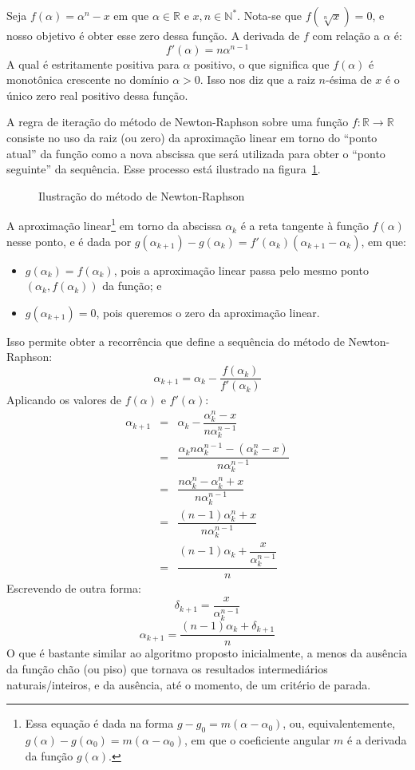 \documentclass{article}
\begin{document}
Seja $f(\alpha) = \alpha^n - x$
em que $\alpha \in \mathds{R}$ e $x, n \in \mathds{N}^*$.
Nota-se que $f(\sqrt[n]{x}) = 0$,
e nosso objetivo é obter esse zero dessa função.
A derivada de $f$ com relação a $\alpha$ é:
\[f'(\alpha) = n \alpha^{n-1}\]
A qual é estritamente positiva para $\alpha$ positivo,
o que significa que $f(\alpha)$ é monotônica crescente
no domínio $\alpha > 0$.
Isso nos diz que a raiz $n$-ésima de $x$
é o único zero real positivo dessa função.

A regra de iteração do método de Newton-Raphson
sobre uma função $f:\mathds{R}\to\mathds{R}$
consiste no uso da raiz (ou zero)
da aproximação linear em torno do ``ponto atual'' da função
como a nova abscissa que será utilizada
para obter o ``ponto seguinte'' da sequência.
Esse processo está ilustrado na figura~\ref{fig:newton-raphson}.

\begin{figure}[H]
  \centering
  
  \caption{Ilustração do método de Newton-Raphson}
  \label{fig:newton-raphson}
\end{figure}

A aproximação linear\footnote{
  Essa equação é dada na forma $g - g_0 = m (\alpha - \alpha_0)$,
  ou, equivalentemente,
  $g(\alpha) - g(\alpha_0) = m (\alpha - \alpha_0)$,
  em que o coeficiente angular $m$ é a derivada da função $g(\alpha)$.
} em torno da abscissa $\alpha_k$
é a reta tangente à função $f(\alpha)$ nesse ponto,
e é dada por
$g(\alpha_{k+1}) - g(\alpha_k) =
 f'(\alpha_k) \left( \alpha_{k+1} - \alpha_k \right)$,
em que:
\begin{itemize}
  \item
  $g(\alpha_k) = f(\alpha_k)$, pois a aproximação linear
  passa pelo mesmo ponto $(\alpha_k, f(\alpha_k))$ da função; e
  \item
  $g(\alpha_{k+1}) = 0$,
  pois queremos o zero da aproximação linear.
\end{itemize}

Isso permite obter a recorrência
que define a sequência do método de Newton-Raphson:
\[\alpha_{k+1} = \alpha_k - \dfrac{f(\alpha_k)}{f'(\alpha_k)}\]
Aplicando os valores de $f(\alpha)$ e $f'(\alpha)$:
\[
  \begin{array}{rcl}
  \alpha_{k+1}
  &=& \alpha_k - \dfrac{\alpha_k^n - x}{n \alpha_k^{n-1}} \\[5mm]
  &=& \dfrac{\alpha_k n \alpha_k^{n-1}
    - (\alpha_k^n - x)}{n \alpha_k^{n-1}} \\[5mm]
  &=& \dfrac{n \alpha_k^n - \alpha_k^n + x}{n \alpha_k^{n-1}} \\[5mm]
  &=& \dfrac{(n-1) \alpha_k^n + x}{n \alpha_k^{n-1}} \\[5mm]
  &=& \dfrac{(n-1) \alpha_k + \dfrac{x}{\alpha_k^{n-1}}}{n}
  \end{array}
\]
Escrevendo de outra forma:
\[\delta_{k+1} = \dfrac{x}{\alpha_k^{n-1}}\]
\[\alpha_{k+1} = \dfrac{(n-1) \alpha_k + \delta_{k+1}}{n}\]
O que é bastante similar ao algoritmo proposto inicialmente,
a menos da ausência da função chão (ou piso)
que tornava os resultados intermediários naturais/inteiros,
e da ausência, até o momento, de um critério de parada.
\end{document}
